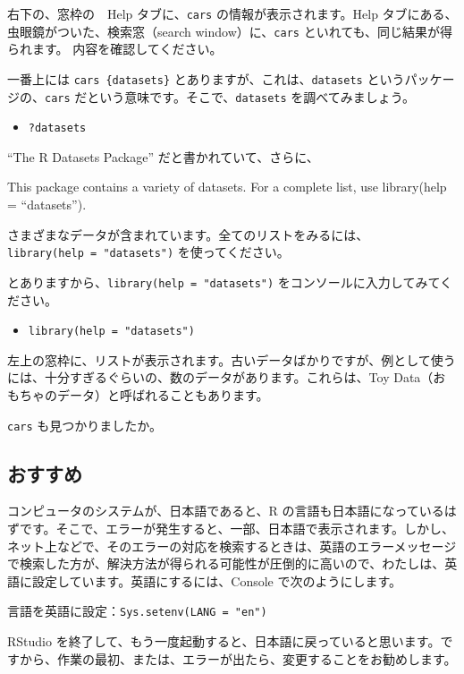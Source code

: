 \documentclass[
  xelatex, ja=standard]{bxjsbook}
\providecommand{\tightlist}{%
  \setlength{\itemsep}{0pt}\setlength{\parskip}{0pt}}
\theoremstyle{definition}
\theoremstyle{definition}
\theoremstyle{definition}
\theoremstyle{definition}
\theoremstyle{remark}
\begin{document}
右下の、窓枠の　Help タブに、\texttt{cars} の情報が表示されます。Help タブにある、虫眼鏡がついた、検索窓（search window）に、\texttt{cars} といれても、同じ結果が得られます。 内容を確認してください。

一番上には \texttt{cars\ \{datasets\}} とありますが、これは、\texttt{datasets} というパッケージの、\texttt{cars} だという意味です。そこで、\texttt{datasets} を調べてみましょう。

\begin{itemize}
\tightlist
\item
  \texttt{?datasets}
\end{itemize}

``The R Datasets Package'' だと書かれていて、さらに、

This package contains a variety of datasets. For a complete list, use library(help = ``datasets'').

さまざまなデータが含まれています。全てのリストをみるには、\texttt{library(help\ =\ "datasets")} を使ってください。

とありますから、\texttt{library(help\ =\ "datasets")} をコンソールに入力してみてください。

\begin{itemize}
\tightlist
\item
  \texttt{library(help\ =\ "datasets")}
\end{itemize}

左上の窓枠に、リストが表示されます。古いデータばかりですが、例として使うには、十分すぎるぐらいの、数のデータがあります。これらは、Toy Data（おもちゃのデータ）と呼ばれることもあります。

\texttt{cars} も見つかりましたか。

\hypertarget{ux304aux3059ux3059ux3081}{%
\subsection{おすすめ}\label{ux304aux3059ux3059ux3081}}

コンピュータのシステムが、日本語であると、R の言語も日本語になっているはずです。そこで、エラーが発生すると、一部、日本語で表示されます。しかし、ネット上などで、そのエラーの対応を検索するときは、英語のエラーメッセージで検索した方が、解決方法が得られる可能性が圧倒的に高いので、わたしは、英語に設定しています。英語にするには、Console で次のようにします。

言語を英語に設定：\texttt{Sys.setenv(LANG\ =\ "en")}

RStudio を終了して、もう一度起動すると、日本語に戻っていると思います。ですから、作業の最初、または、エラーが出たら、変更することをお勧めします。
\end{document}
